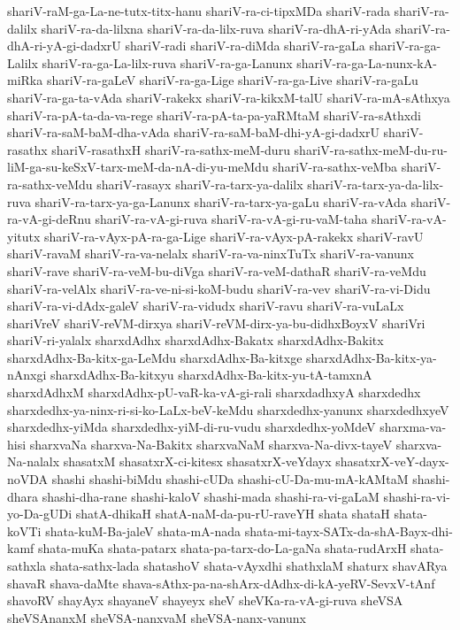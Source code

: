 {shariV-raM-ga-La-ne-tutx-titx-hanu
shariV-ra-ci-tipxMDa
shariV-rada
shariV-ra-dalilx
shariV-ra-da-lilxna
shariV-ra-da-lilx-ruva
shariV-ra-dhA-ri-yAda
shariV-ra-dhA-ri-yA-gi-dadxrU
shariV-radi
shariV-ra-diMda
shariV-ra-gaLa
shariV-ra-ga-Lalilx
shariV-ra-ga-La-lilx-ruva
shariV-ra-ga-Lanunx
shariV-ra-ga-La-nunx-kA-miRka
shariV-ra-gaLeV
shariV-ra-ga-Lige
shariV-ra-ga-Live
shariV-ra-gaLu
shariV-ra-ga-ta-vAda
shariV-rakekx
shariV-ra-kikxM-talU
shariV-ra-mA-sAthxya
shariV-ra-pA-ta-da-va-rege
shariV-ra-pA-ta-pa-yaRMtaM
shariV-ra-sAthxdi
shariV-ra-saM-baM-dha-vAda
shariV-ra-saM-baM-dhi-yA-gi-dadxrU
shariV-rasathx
shariV-rasathxH
shariV-ra-sathx-meM-duru
shariV-ra-sathx-meM-du-ru-liM-ga-su-keSxV-tarx-meM-da-nA-di-yu-meMdu
shariV-ra-sathx-veMba
shariV-ra-sathx-veMdu
shariV-rasayx
shariV-ra-tarx-ya-dalilx
shariV-ra-tarx-ya-da-lilx-ruva
shariV-ra-tarx-ya-ga-Lanunx
shariV-ra-tarx-ya-gaLu
shariV-ra-vAda
shariV-ra-vA-gi-deRnu
shariV-ra-vA-gi-ruva
shariV-ra-vA-gi-ru-vaM-taha
shariV-ra-vA-yitutx
shariV-ra-vAyx-pA-ra-ga-Lige
shariV-ra-vAyx-pA-rakekx
shariV-ravU
shariV-ravaM
shariV-ra-va-nelalx
shariV-ra-va-ninxTuTx
shariV-ra-vanunx
shariV-rave
shariV-ra-veM-bu-diVga
shariV-ra-veM-dathaR
shariV-ra-veMdu
shariV-ra-velAlx
shariV-ra-ve-ni-si-koM-budu
shariV-ra-vev
shariV-ra-vi-Didu
shariV-ra-vi-dAdx-galeV
shariV-ra-vidudx
shariV-ravu
shariV-ra-vuLaLx
shariVreV
shariV-reVM-dirxya
shariV-reVM-dirx-ya-bu-didhxBoyxV
shariVri
shariV-ri-yalalx
sharxdAdhx
sharxdAdhx-Bakatx
sharxdAdhx-Bakitx
sharxdAdhx-Ba-kitx-ga-LeMdu
sharxdAdhx-Ba-kitxge
sharxdAdhx-Ba-kitx-ya-nAnxgi
sharxdAdhx-Ba-kitxyu
sharxdAdhx-Ba-kitx-yu-tA-tamxnA
sharxdAdhxM
sharxdAdhx-pU-vaR-ka-vA-gi-rali
sharxdadhxyA
sharxdedhx
sharxdedhx-ya-ninx-ri-si-ko-LaLx-beV-keMdu
sharxdedhx-yanunx
sharxdedhxyeV
sharxdedhx-yiMda
sharxdedhx-yiM-di-ru-vudu
sharxdedhx-yoMdeV
sharxma-va-hisi
sharxvaNa
sharxva-Na-Bakitx
sharxvaNaM
sharxva-Na-divx-tayeV
sharxva-Na-nalalx
shasatxM
shasatxrX-ci-kitesx
shasatxrX-veYdayx
shasatxrX-veY-dayx-noVDA
shashi
shashi-biMdu
shashi-cUDa
shashi-cU-Da-mu-mA-kAMtaM
shashi-dhara
shashi-dha-rane
shashi-kaloV
shashi-mada
shashi-ra-vi-gaLaM
shashi-ra-vi-yo-Da-gUDi
shatA-dhikaH
shatA-naM-da-pu-rU-raveYH
shata
shataH
shata-koVTi
shata-kuM-Ba-jaleV
shata-mA-nada
shata-mi-tayx-SATx-da-shA-Bayx-dhi-kamf
shata-muKa
shata-patarx
shata-pa-tarx-do-La-gaNa
shata-rudArxH
shata-sathxla
shata-sathx-lada
shatashoV
shata-vAyxdhi
shathxlaM
shaturx
shavARya
shavaR
shava-daMte
shava-sAthx-pa-na-shArx-dAdhx-di-kA-yeRV-SevxV-tAnf
shavoRV
shayAyx
shayaneV
shayeyx
sheV
sheVKa-ra-vA-gi-ruva
sheVSA
sheVSAnanxM
sheVSA-nanxvaM
sheVSA-nanx-vanunx
}
